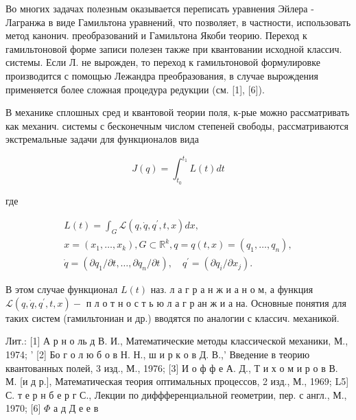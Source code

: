 \documentclass[10pt]{article}
\begin{document}
Во многих задачах полезным оказывается переписать уравнения Эйлера - Лагранжа в виде Гамильтона уравнений, что позволяет, в частности, использовать метод канонич. преобразований и Гамильтона Якоби теорию. Переход к гамильтоновой форме записи полезен также при квантовании исходной классич. системы. Если Л. не вырожден, то переход к гамильтоновой формулировке производится с помощью Лежандра преобразования, в случае вырождения применяется более сложная процедура редукции (см. [1], [6]).



В механике сплошных сред и квантовой теории поля, к-рые можно рассматривать как механич. системы с бесконечным числом степеней свободы, рассматриваются экстремальные задачи для функционалов вида



\[

J(q)=\int_{t_{0}}^{t_{1}} L(t) d t

\]



где



\[

\begin{gathered}

L(t)=\int_{G} \mathscr{L}\left(q, \dot{q}, q^{\prime}, t, x\right) d x, \\

x=\left(x_{1}, \ldots, x_{k}\right), G \subset \mathbb{R}^{k}, q=q(t, x)=\left(q_{1}, \ldots, q_{n}\right), \\

\dot{q}=\left(\partial q_{1} / \partial t, \ldots, \partial q_{n} / \partial t\right), \quad q^{\prime}=\left(\partial q_{i} / \partial x_{j}\right) .

\end{gathered}

\]



В этом случае функционал $L(t)$ наз. л а г р а н ж и а н о м, а функция $\mathscr{L}\left(q, \dot{q}, q^{\prime}, t, x\right)-$ п л о т н о с т ь ю л а г р ан ж и а на. Основные понятия для таких систем (гамильтониан и др.) вводятся по аналогии с классич. механикой.



Лит.: [1] А р н о ль д В. И., Математические методы классической механики, М., 1974; ' [2] Бо г о л ю б о в Н. Н., ш и р к о в Д. В.,' Введение в теорию квантованных полей, 3 изд., М., 1976; [3] И о ф ф е А. Д., Т и х о м и р о в В. М. [и д р.], Математическая теория оптимальных процессов, 2 изд., М., 1969; L5] С. т е р н б е р г С., Лекции по диффференциальной геометрии, пер. с англ., М., 1970; [6] $\Phi$ а д Д е е в
\end{document}
